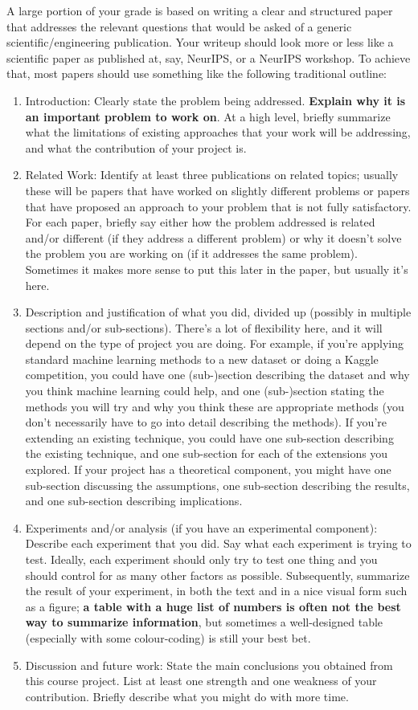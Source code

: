 \documentclass{article}
\begin{document}
A large portion of your grade is based on writing a clear and structured paper that addresses the relevant questions that would be asked of a generic scientific/engineering publication.
Your writeup should look more or less like a scientific paper as published at, say, NeurIPS,
or a NeurIPS workshop.
To achieve that, most papers should use something like the following traditional outline:
\begin{enumerate}
\item Introduction: Clearly state the problem being addressed. \textbf{Explain why it is an important problem to work on}. At a high level, briefly summarize what the limitations of existing approaches that your work will be addressing, and what the contribution of your project is.
\item Related Work: Identify at least three publications on related topics; usually these will be papers that have worked on slightly different problems or papers that have proposed an approach to your problem that is not fully satisfactory. For each paper, briefly say either how the problem addressed is related and/or different (if they address a different problem) or why it doesn't solve the problem you are working on (if it addresses the same problem). Sometimes it makes more sense to put this later in the paper, but usually it's here.
\item Description and justification of what you did, divided up (possibly in multiple sections and/or sub-sections). There's a lot of flexibility here, and it will depend on the type of project you are doing. For example, if you're applying standard machine learning methods to a new dataset or doing a Kaggle competition, you could have one (sub-)section describing the dataset and why you think machine learning could help, and one (sub-)section stating the methods you will try and why you think these are appropriate methods (you don't necessarily have to go into detail describing the methods). If you're extending an existing technique, you could have one sub-section describing the existing technique, and one sub-section for each of the extensions you explored. If your project has a theoretical component, you might have one sub-section discussing the assumptions, one sub-section describing the results, and one sub-section describing implications.
\item Experiments and/or analysis (if you have an experimental component): Describe each experiment that you did. Say what each experiment is trying to test. Ideally, each experiment should only try to test one thing and you should control for as many other factors as possible. Subsequently, summarize the result of your experiment, in both the text and in a nice visual form such as a figure; \textbf{a table with a huge list of numbers is often not the best way to summarize information}, but sometimes a well-designed table (especially with some colour-coding) is still your best bet.
\item Discussion and future work: State the main conclusions you obtained from this course project. List at least one strength and one weakness of your contribution. Briefly describe what you might do with more time.
\end{enumerate}
\end{document}
